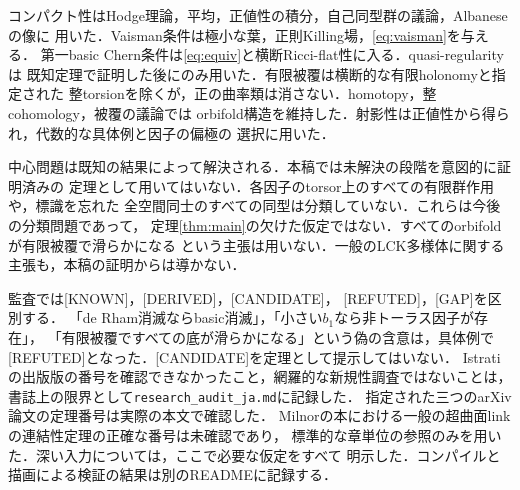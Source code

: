\documentclass[12pt]{amsart}
\theoremstyle{definition}
\theoremstyle{remark}
\numberwithin{equation}{section}
\newcommand{\AIstatus}[1]{\textnormal{\textsf{[#1]}}}
\begin{document}
コンパクト性はHodge理論，平均，正値性の積分，自己同型群の議論，Albaneseの像に
用いた．Vaisman条件は極小な葉，正則Killing場，\eqref{eq:vaisman}を与える．
第一basic Chern条件は\eqref{eq:equiv}と横断Ricci-flat性に入る．quasi-regularityは
既知定理で証明した後にのみ用いた．有限被覆は横断的な有限holonomyと指定された
整torsionを除くが，正の曲率類は消さない．homotopy，整cohomology，被覆の議論では
orbifold構造を維持した．射影性は正値性から得られ，代数的な具体例と因子の偏極の
選択に用いた．

中心問題は既知の結果によって解決される．本稿では未解決の段階を意図的に証明済みの
定理として用いてはいない．各因子のtorsor上のすべての有限群作用や，標識を忘れた
全空間同士のすべての同型は分類していない．これらは今後の分類問題であって，
定理\ref{thm:main}の欠けた仮定ではない．すべてのorbifoldが有限被覆で滑らかになる
という主張は用いない．一般のLCK多様体に関する主張も，本稿の証明からは導かない．

監査では\AIstatus{KNOWN}，\AIstatus{DERIVED}，\AIstatus{CANDIDATE}，
\AIstatus{REFUTED}，\AIstatus{GAP}を区別する．
「de Rham消滅ならbasic消滅」，「小さい$b_1$なら非トーラス因子が存在」，
「有限被覆ですべての底が滑らかになる」という偽の含意は，具体例で
\AIstatus{REFUTED}となった．\AIstatus{CANDIDATE}を定理として提示してはいない．
Istratiの出版版の番号を確認できなかったこと，網羅的な新規性調査ではないことは，
書誌上の限界として\texttt{research\_audit\_ja.md}に記録した．
指定された三つのarXiv論文の定理番号は実際の本文で確認した．
Milnorの本における一般の超曲面linkの連結性定理の正確な番号は未確認であり，
標準的な章単位の参照のみを用いた．深い入力については，ここで必要な仮定をすべて
明示した．コンパイルと描画による検証の結果は別のREADMEに記録する．
\end{document}
